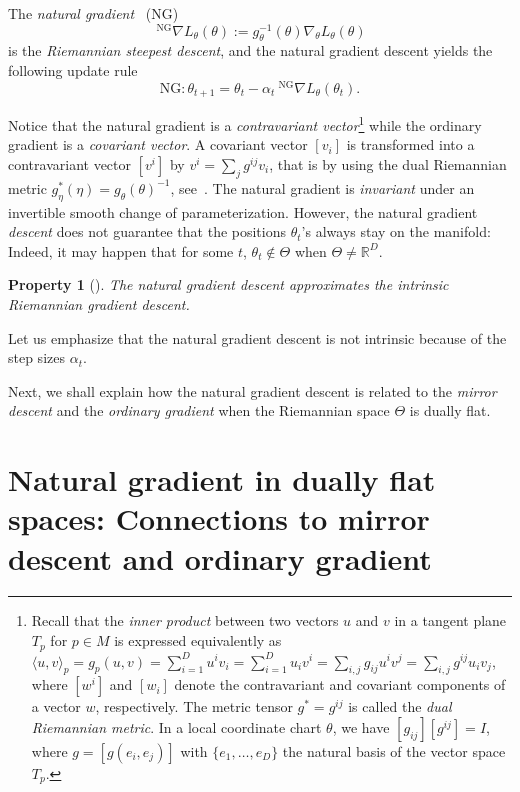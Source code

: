 \documentclass[11pt]{article}
\def\leftsup#1{\ ^{#1}}
\def\bbR{\mathbb{R}}
\def\inner#1#2{\langle #1,#2\rangle}
\def\NG{\mathrm{NG}}
\def\nablaNG{\leftsup{\NG}\nabla}
\newtheorem{property}{Property}
\begin{document}
The {\em natural gradient}~\cite{Amari-1998} (NG)
\begin{equation}
\nablaNG L_\theta(\theta) := g^{-1}_\theta(\theta) \nabla_\theta L_\theta(\theta)
\end{equation}
 is the {\em Riemannian steepest descent}, and the natural gradient descent yields the following update rule
\begin{equation}
\mathrm{NG}: \theta_{t+1}= \theta_t-\alpha_t \nablaNG L_\theta(\theta_t).
\end{equation}

Notice that the natural gradient is a {\em contravariant vector}\footnote{Recall that the {\em inner product} between two vectors $u$ and $v$ in a tangent plane $T_p$ for $p\in M$ is expressed equivalently as $
\inner{u}{v}_p=g_p(u,v)=\sum_{i=1}^D u^i v_i = \sum_{i=1}^D u_i v^i = \sum_{i,j} g_{ij} u^i v^j = \sum_{i,j} g^{ij} u_i v_j$, 
where $[w^i]$ and $[w_i]$ denote the contravariant and covariant components of a vector $w$, respectively.
The metric tensor $g^*=g^{ij}$ is called the {\em dual Riemannian metric}. In a local coordinate chart $\theta$, we have
$[g_{ij}] [g^{ij}]=I$, where $g=[g(e_i,e_j)]$ with $\{e_1,\ldots, e_D\}$ the natural basis of the vector space $T_p$.
} while the ordinary gradient is a {\em covariant vector}.
A covariant vector $[v_i]$ is transformed into a contravariant vector $[v^i]$ by $v^i=\sum_j g^{ij}v_i$, 
that is by using the dual Riemannian metric $g^*_\eta(\eta)=g_\theta(\theta)^{-1}$, see~\cite{EIG-2018}.
The natural gradient is {\em invariant} under an invertible smooth change of parameterization.
However, the natural gradient {\em descent}  does not guarantee that the positions $\theta_t$'s always stay on the manifold:
Indeed, it may happen that for some $t$, $\theta_t\not\in\Theta$ when $\Theta\not=\bbR^D$.

\begin{property}[\cite{Bonnabel-2013}]
The natural gradient descent approximates the intrinsic Riemannian gradient descent.
\end{property}

Let us emphasize that the natural gradient descent is not intrinsic because of the step sizes $\alpha_t$.

Next, we shall explain how the natural gradient descent is related to the {\em mirror descent} and the {\em ordinary gradient} when the Riemannian space $\Theta$ is dually flat.



\section{Natural gradient in dually flat spaces: Connections to mirror descent and ordinary gradient}
\end{document}
